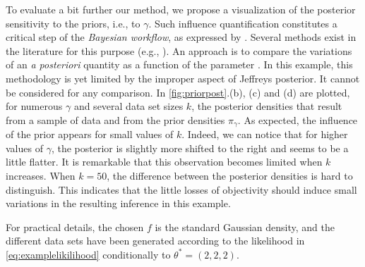To evaluate a bit further our method, we propose a visualization of the posterior sensitivity to the priors, i.e., to $\gamma$. 
Such influence quantification constitutes a critical step of the \emph{Bayesian workflow}, as expressed by   \citet{gelman_bayesian_2020}. Several methods exist  in the literature for this purpose (e.g., \cite{berger_robust_1990,nott_checking_2020}). 
An approach is to compare the variations of an \emph{a posteriori} quantity as a function of the parameter \citep{kallioinen_detecting_2023}. In this example, this methodology is yet limited by the improper aspect of Jeffreys posterior. It cannot be considered for any comparison.
In \cref{fig:priorpost}.(b), (c) and (d) are plotted, for numerous $\gamma$ and several data set sizes $k$, the posterior densities that result from a sample of data and from the prior densities $\pi_\gamma$.
As expected, the influence of the prior appears for small values of $k$.
Indeed, we can notice that for higher values of $\gamma$, the posterior is slightly more shifted to the right and seems to be a little flatter. 
It is remarkable that this observation becomes limited when $k$ increases. When $k=50$, the difference between the posterior densities 
is hard to distinguish. %
This indicates that the little losses of objectivity should induce small variations in the resulting inference in this example.

For practical details, the chosen $f$ is the standard Gaussian density, and the different data sets have been generated according to the likelihood in \cref{eq:examplelikilihood} conditionally to $\theta^\ast=(2,2,2)$. %








